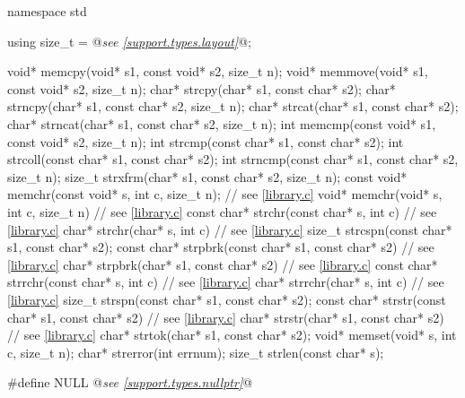 %
%
%
%
%
%
%
%
%
%
%
%
%
%
%
%
%
%
%
%
%
%
%
%
%
\begin{codeblock}
namespace std {
  using size_t = @\textit{see \ref{support.types.layout}}@;

  void* memcpy(void* s1, const void* s2, size_t n);
  void* memmove(void* s1, const void* s2, size_t n);
  char* strcpy(char* s1, const char* s2);
  char* strncpy(char* s1, const char* s2, size_t n);
  char* strcat(char* s1, const char* s2);
  char* strncat(char* s1, const char* s2, size_t n);
  int memcmp(const void* s1, const void* s2, size_t n);
  int strcmp(const char* s1, const char* s2);
  int strcoll(const char* s1, const char* s2);
  int strncmp(const char* s1, const char* s2, size_t n);
  size_t strxfrm(char* s1, const char* s2, size_t n);
  const void* memchr(const void* s, int c, size_t n);  // see \ref{library.c}
  void* memchr(void* s, int c, size_t n)  // see \ref{library.c}
  const char* strchr(const char* s, int c)  // see \ref{library.c}
  char* strchr(char* s, int c)  // see \ref{library.c}
  size_t strcspn(const char* s1, const char* s2);
  const char* strpbrk(const char* s1, const char* s2)  // see \ref{library.c}
  char* strpbrk(char* s1, const char* s2)  // see \ref{library.c}
  const char* strrchr(const char* s, int c)  // see \ref{library.c}
  char* strrchr(char* s, int c)  // see \ref{library.c}
  size_t strspn(const char* s1, const char* s2);
  const char* strstr(const char* s1, const char* s2)  // see \ref{library.c}
  char* strstr(char* s1, const char* s2)  // see \ref{library.c}
  char* strtok(char* s1, const char* s2);
  void* memset(void* s, int c, size_t n);
  char* strerror(int errnum);
  size_t strlen(const char* s);
}

#define NULL @\textit{see \ref{support.types.nullptr}}@
\end{codeblock}

